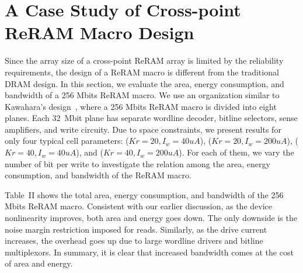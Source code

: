 \vspace{-5pt}
\section{A Case Study of Cross-point ReRAM Macro Design}\label{sec:macro}
Since the array size of a cross-point ReRAM array is limited by
the reliability requirements, the design of a ReRAM macro is different
from the traditional DRAM design. 
In this section, we evaluate the area, energy consumption, and bandwidth of a
256 Mbits ReRAM macro.
We use an organization similar to Kawahara's design~\cite{crossbar_Panasonic}, where
a 256 Mbits ReRAM macro is divided into 
eight planes. Each 32~Mbit plane has separate wordline
decoder, bitline selectors, sense amplifiers, and write circuity. Due to
space constraints, we present results for only
four typical cell parameters: ($Kr=20,
I_w=40uA$), ($Kr=20, I_w=200uA$), ($Kr=40, I_w=40uA$), and ($Kr=40,
I_w=200uA$). For each of them, we vary the number of bit per write to
investigate the relation among the area, energy consumption, and bandwidth
of the ReRAM macro.


Table~II shows the total area, energy consumption, and bandwidth of the
256 Mbits ReRAM macro. Consistent with our earlier discussion, 
as the device nonlinearity improves, both area and energy 
goes down. The only downside is the noise margin restriction
imposed for reads. Similarly, as the drive current increases, the overhead
goes up due to large wordline drivers and bitline multiplexors. 
In summary, it is clear that increased bandwidth comes at the cost of area
and energy. 

